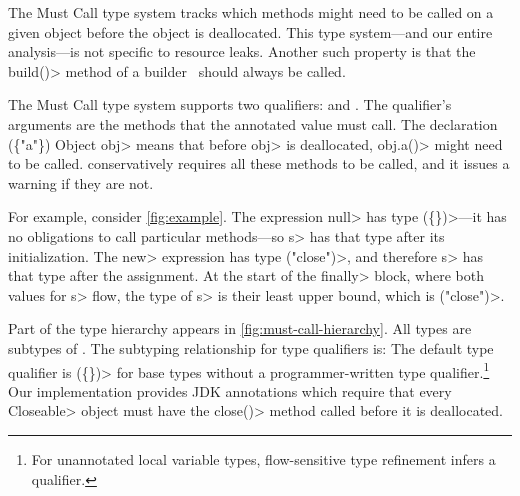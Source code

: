 
The Must Call type system tracks which methods might need to be called
on a given object before the object is deallocated.  This type system---and
our entire analysis---is not specific to resource leaks. Another such
  property is that the
  \<build()> method of a builder~\cite{designpatterns} should always
  be called.

The Must Call type system supports two qualifiers: \MustCall and
\MustCallUnknown. The \MustCall qualifier's arguments are the
methods that
the annotated value
must call. The declaration
\MustCall\<(\{"a"\}) Object obj> means that before \<obj> is
deallocated, \<obj.a()> might need to be called.
\Tool conservatively requires all these methods to be called,
and it issues a warning if they are not.

For example, consider \cref{fig:example}. The expression \<null> has type
\MustCall\<(\{\})>---it has no obligations
to call particular methods---so \<s> has that type after its initialization.
The \<new> expression has type \MustCall\<("close")>, and therefore
\<s> has that type after the assignment.
At the start of the \<finally> block, where both values for \<s> flow,
the type of \<s> is their least upper bound, which is \MustCall\<("close")>.


Part of the type hierarchy appears in \cref{fig:must-call-hierarchy}.
All types are subtypes of \MustCallUnknown.
The subtyping relationship for \MustCall type qualifiers is:
The default type qualifier is \MustCall\<(\{\})> for base types without a
programmer-written type qualifier.\footnote{For unannotated local variable types,
  flow-sensitive type refinement infers a qualifier.}
Our implementation
provides JDK annotations which require that every 
\<Closeable> object must have the \<close()> method called before
it is deallocated.  

